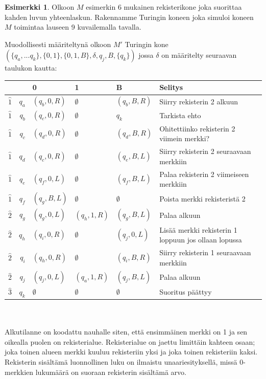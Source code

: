 \documentclass[a4paper, 12pt]{article}
\theoremstyle{definition}
\newtheorem{example}[mydef]{Esimerkki}
\theoremstyle{plain}
\begin{document}
\begin{example}
Olkoon $M$ esimerkin 6 mukainen rekisterikone joka suorittaa kahden luvun yhteenlaskun. Rakennamme Turingin koneen joka simuloi koneen $M$ toimintaa lauseen 9 kuvailemalla tavalla.

Muodollisesti määriteltynä olkoon $M'$ Turingin kone \\$(\{q_a, ... q_k\}, \{0, 1\}, \{0, 1, B\} , \delta, q_j, B, \{q_{k}\})$ jossa $\delta$ on määritelty seuraavan taulukon kautta:

\begin{tabular}{r | r | l l l | p{5cm}}
& & 0 & 1 & B & Selitys\\
\hline
$\hat{1}$ & $q_a$ & $(q_b, 0, R)$ & $\emptyset$  & $(q_b, B, R)$ & Siirry rekisterin 2 alkuun \\
$\hat{1}$ & $q_b$ & $(q_c, 0, R)$ &$\emptyset$  & $q_k$ & Tarkista ehto \\
$\hat{1}$ & $q_c$ & $(q_d, 0, R)$ &  $\emptyset$  & $(q_d, B, R)$ & Ohitettiinko rekisterin 2 viimein merkki? \\
$\hat{1}$ & $q_d$ & $(q_c, 0, R)$ & $\emptyset$  & $(q_e, B, L)$ & Siirry rekisterin 2 seuraavaan merkkiin \\
$\hat{1}$ & $q_e$ & $(q_f, 0, L)$ &  $\emptyset$  & $(q_f, B, L)$ & Palaa rekisterin 2 viimeiseen merkkiin\\
$\hat{1}$ & $q_f$ & $(q_g, B, L)$ &  $\emptyset$  & $\emptyset$  & Poista merkki rekisteristä 2 \\
$\hat{2}$ & $q_g$ & $(q_g, 0, L)$ &  $(q_h,1, R)$ & $(q_g, B, L)$ & Palaa alkuun\\
$\hat{2}$ & $q_h$ & $(q_i, 0, R)$ &  $\emptyset$ & $(q_j, 0, L)$ & Lisää merkki rekisterin 1 loppuun jos ollaan lopussa\\
$\hat{2}$ & $q_i$ & $(q_h, 0, R)$ & $\emptyset$  & $(q_i, B, R)$ & Siirry rekisterin 1 seuraavaan merkkiin \\
$\hat{2}$ & $q_j$ & $(q_j, 0, L)$ &  $(q_a,1, R)$ & $(q_j, B, L)$ & Palaa alkuun\\
$\hat{3}$ & $q_k$ & $\emptyset$  &  $\emptyset$  & $\emptyset$  & Suoritus päättyy\\
\end{tabular}
\\
\\
Alkutilanne on koodattu nauhalle siten, että ensimmäinen merkki on 1 ja sen oikealla puolen on rekisterialue. Rekisterialue on jaettu limittäin kahteen osaan; joka toinen alueen merkki kuuluu rekisteriin yksi ja joka toinen rekisteriin kaksi. Rekisterin sisältämä luonnollinen luku on ilmaistu unaariesityksellä, missä 0-merkkien lukumäärä on suoraan rekisterin sisältämä arvo.


\end{example}
\end{document}
